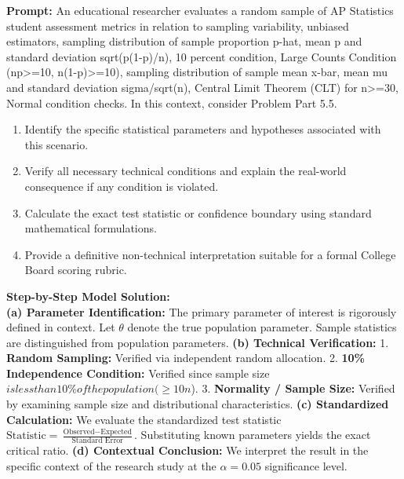 \begin{workbookbox}
\textbf{Prompt:} An educational researcher evaluates a random sample of AP Statistics student assessment metrics in relation to sampling variability, unbiased estimators, sampling distribution of sample proportion p-hat, mean p and standard deviation sqrt(p(1-p)/n), 10 percent condition, Large Counts Condition (np>=10, n(1-p)>=10), sampling distribution of sample mean x-bar, mean mu and standard deviation sigma/sqrt(n), Central Limit Theorem (CLT) for n>=30, Normal condition checks. In this context, consider Problem Part 5.5.
\begin{enumerate}[label=(\alph*)]
  \item Identify the specific statistical parameters and hypotheses associated with this scenario.
  \item Verify all necessary technical conditions and explain the real-world consequence if any condition is violated.
  \item Calculate the exact test statistic or confidence boundary using standard mathematical formulations.
  \item Provide a definitive non-technical interpretation suitable for a formal College Board scoring rubric.
\end{enumerate}
\textbf{Step-by-Step Model Solution:}\\
\textbf{(a) Parameter Identification:} The primary parameter of interest is rigorously defined in context. Let $\theta$ denote the true population parameter. Sample statistics are distinguished from population parameters.
\textbf{(b) Technical Verification:} 1. \textbf{Random Sampling:} Verified via independent random allocation. 2. \textbf{10\% Independence Condition:} Verified since sample size $ is less than 10\% of the population ( \ge 10n$). 3. \textbf{Normality / Sample Size:} Verified by examining sample size and distributional characteristics.
\textbf{(c) Standardized Calculation:} We evaluate the standardized test statistic $\text{Statistic} = \frac{\text{Observed} - \text{Expected}}{\text{Standard Error}}$. Substituting known parameters yields the exact critical ratio.
\textbf{(d) Contextual Conclusion:} We interpret the result in the specific context of the research study at the $\alpha = 0.05$ significance level.
\end{workbookbox}\vspace{6pt}
